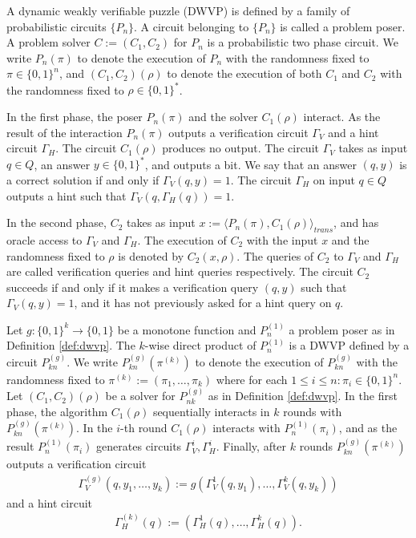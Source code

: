 \begin{definition}
  \label{def:dwvp}
  A dynamic weakly verifiable puzzle (DWVP) is defined by a family of probabilistic circuits $\{P_n\}$.
  A circuit belonging to $\{P_n\}$ is called a problem poser.
  A problem solver $C := (C_1, C_2)$ for $P_n$ is a probabilistic two phase circuit.
  We write $P_n(\pi)$ to denote the execution of $P_n$ with the randomness fixed to $\pi \in \{0,1\}^n$, and $(C_1,C_2)(\rho)$
  to denote the execution of both $C_1$ and $C_2$ with the randomness fixed to $\rho \in \{0,1\}^{*}$.

  In the first phase, the poser $P_n(\pi)$ and the solver $C_1(\rho)$ interact.
  As the result of the interaction $P_n(\pi)$ outputs a verification circuit $\Gamma_{V}$ and a hint circuit $\Gamma_{H}$.
  The circuit $C_1(\rho)$ produces no output.
  The circuit $\Gamma_{V}$ takes as input $q \in Q$, an answer $y \in \{0,1\}^*$,
  and outputs a bit. We say that an answer $(q,y)$ is a correct solution if and only if $\Gamma_V(q,y) = 1$.
  The circuit $\Gamma_H$ on input $q \in Q$ outputs a hint such that $\Gamma_V(q,\Gamma_H(q)) = 1$.

  In the second phase, $C_2$ takes as input $x := \langle P_n(\pi), C_1(\rho) \rangle_{\mathit{trans}}$,
  and has oracle access to $\Gamma_V$ and $\Gamma_H$.
  The execution of $C_2$ with the input $x$ and the randomness fixed to $\rho$
  is denoted by $C_2(x, \rho)$. The queries of $C_2$ to $\Gamma_V$ and $\Gamma_H$ are called verification queries and hint queries respectively.
  The circuit $C_2$ succeeds if and only if it makes a verification query $(q,y)$ such that $\Gamma_V(q,y) = 1$,
  and it has not previously asked for a hint query on $q$.
\end{definition}
%
\begin{definition}
  Let $g: \{0,1\}^{k} \rightarrow \{0,1\}$ be a monotone function and $P_n^{(1)}$ a problem poser as in Definition \ref{def:dwvp}.
  The $k$-wise direct product of $P_n^{(1)}$ is a DWVP defined by a circuit $P_{kn}^{(g)}$.
  We write $P_{kn}^{(g)}(\pi^{(k)})$ to denote the execution of $P_{kn}^{(g)}$ with the randomness fixed to $\pi^{(k)} := (\pi_1, \dots, \pi_k)$
  where for each $1 \leq i \leq n : \pi_i \in \{0,1\}^n.$
  Let $(C_1, C_2)(\rho)$ be a solver for $P_{nk}^{(g)}$ as in Definition \ref{def:dwvp}.
  In the first phase, the algorithm $C_1(\rho)$ sequentially interacts in $k$ rounds with $P_{kn}^{(g)}(\pi^{(k)})$.
  In the $i$-th round $C_1(\rho)$ interacts with $P_n^{(1)}(\pi_i)$,
  and as the result $P_{n}^{(1)}(\pi_i)$ generates circuits $\Gamma_V^i, \Gamma_H^i$.
  Finally, after $k$ rounds $P_{kn}^{(g)}(\pi^{(k)})$ outputs a verification circuit
\begin{align*}
  \Gamma_V^{(g)} (q, y_1, \dots, y_k) := g(\Gamma_V^{1}(q, y_1), \dots, \Gamma_V^{k}(q, y_k))
\end{align*}
and a hint circuit
\begin{align*}
  \Gamma_H^{(k)} (q) := (\Gamma_H^{1}(q), \dots, \Gamma_H^{k}(q)).
\end{align*}
\end{definition}
